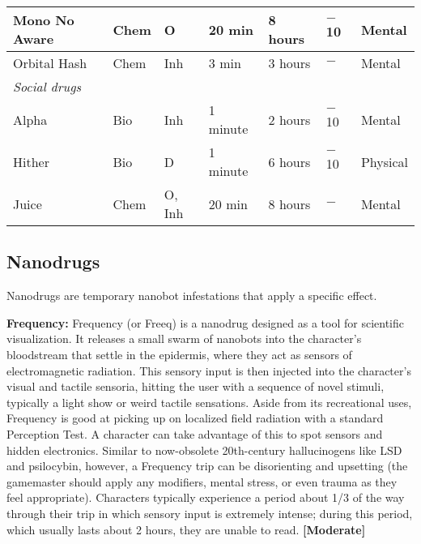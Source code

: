 \begin{table}
\begin{tabularx}{\textwidth}{|X|l|l|l|l|X|X|}
Mono No Aware	&Chem	&O	&20 min	&8 hours	&$-$10	&Mental	\\ \hline

Orbital Hash	&Chem	&Inh	&3 min	&3 hours	&$-$	&Mental	\\ \hline

\multicolumn{7}{|l|}{\emph{Social drugs}}	\\ \hline

Alpha	&Bio	&Inh	&1 minute	&2 hours	&$-$10	&Mental	\\ \hline

Hither	&Bio	&D	&1 minute	&6 hours	&$-$10	&Physical	\\ \hline

Juice	&Chem	&O, Inh	&20 min	&8 hours	&$-$	&Mental	\\ \hline

\end{tabularx} \end{table} 

\clearpage



\label{tab:drugs} 



\subsection{Nanodrugs} \label{sec:nanodrugs} 

Nanodrugs are temporary nanobot infestations that apply a specific effect. 

\textbf{Frequency:} Frequency (or Freeq) is a nanodrug designed as a tool for scientific visualization. It releases a small swarm of nanobots into the character’s bloodstream that settle in the epidermis, where they act as sensors of electromagnetic radiation. This sensory input is then injected into the character’s visual and tactile sensoria, hitting the user with a sequence of novel stimuli, typically a light show or weird tactile sensations. Aside from its recreational uses, Frequency is good at picking up on localized field radiation with a standard Perception Test. A character can take advantage of this to spot sensors and hidden electronics. Similar to now-obsolete 20th-century hallucinogens like LSD and psilocybin, however, a Frequency trip can be disorienting and upsetting (the gamemaster should apply any modifiers, mental stress, or even trauma as they feel appropriate). Characters typically experience a period about 1/3 of the way through their trip in which sensory input is extremely intense; during this period, which usually lasts about 2 hours, they are unable to read. \textbf{[Moderate]} 

